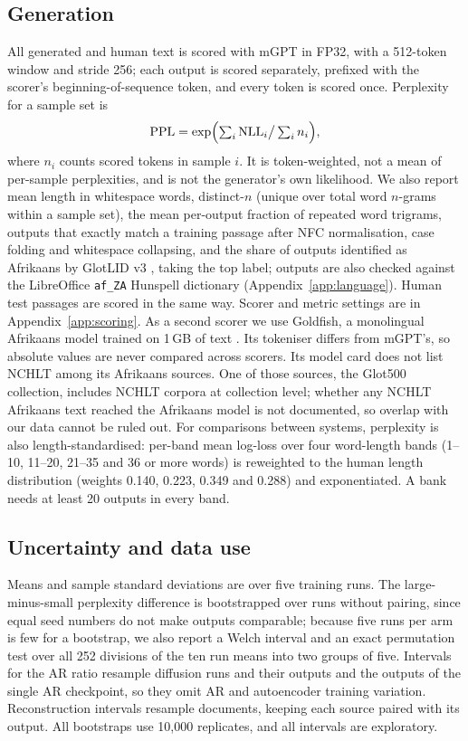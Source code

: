 \documentclass[11pt,a4paper]{article}
\begin{document}
\subsection{Generation}
All generated and human text is scored with mGPT in FP32, with a 512-token window and stride 256; each output is scored separately, prefixed with the scorer's beginning-of-sequence token, and every token is scored once. Perplexity for a sample set is
\begin{equation}
\mathrm{PPL} = \exp\Bigl(\textstyle\sum_i \mathrm{NLL}_i \big/ \sum_i n_i\Bigr),
\end{equation}
where $n_i$ counts scored tokens in sample $i$. It is token-weighted, not a mean of per-sample perplexities, and is not the generator's own likelihood. We also report mean length in whitespace words, distinct-$n$ (unique over total word $n$-grams within a sample set), the mean per-output fraction of repeated word trigrams, outputs that exactly match a training passage after NFC normalisation, case folding and whitespace collapsing, and the share of outputs identified as Afrikaans by GlotLID v3 \citep{kargaran2023glotlid}, taking the top label; outputs are also checked against the LibreOffice \texttt{af\_ZA} Hunspell dictionary (Appendix~\ref{app:language}). Human test passages are scored in the same way. Scorer and metric settings are in Appendix~\ref{app:scoring}. As a second scorer we use Goldfish, a monolingual Afrikaans model trained on 1\,GB of text \citep{chang2024goldfish}. Its tokeniser differs from mGPT's, so absolute values are never compared across scorers. Its model card does not list NCHLT among its Afrikaans sources. One of those sources, the Glot500 collection, includes NCHLT corpora at collection level; whether any NCHLT Afrikaans text reached the Afrikaans model is not documented, so overlap with our data cannot be ruled out. For comparisons between systems, perplexity is also length-standardised: per-band mean log-loss over four word-length bands (1--10, 11--20, 21--35 and 36 or more words) is reweighted to the human length distribution (weights 0.140, 0.223, 0.349 and 0.288) and exponentiated. A bank needs at least 20 outputs in every band.

\subsection{Uncertainty and data use}
Means and sample standard deviations are over five training runs. The large-minus-small perplexity difference is bootstrapped over runs without pairing, since equal seed numbers do not make outputs comparable; because five runs per arm is few for a bootstrap, we also report a Welch interval and an exact permutation test over all 252 divisions of the ten run means into two groups of five. Intervals for the AR ratio resample diffusion runs and their outputs and the outputs of the single AR checkpoint, so they omit AR and autoencoder training variation. Reconstruction intervals resample documents, keeping each source paired with its output. All bootstraps use 10,000 replicates, and all intervals are exploratory.
\end{document}
